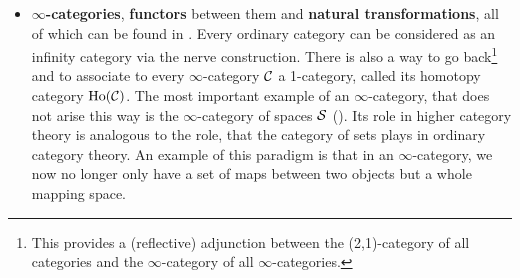 \begin{itemize}
    \item \textbf{$\infty$-categories}, \textbf{functors} between them and \textbf{natural transformations}, all of which can be found in \cite[Chapter~1]{HigherToposTheory}. Every ordinary category can be considered as an infinity category via the nerve construction. There is also a way to go back\footnote{This provides a (reflective) adjunction between the (2,1)-category of all categories and the $\infty$-category of all $\infty$-categories.} and to associate to every $\infty$-category $\mathcal{C}$ a 1-category, called its homotopy category $\operatorname{Ho}(\mathcal{C})$.
    The most important example of an $\infty$-category, that does not arise this way is the $\infty$-category of spaces $\mathcal{S}$ (\cite[Section~1.2.16]{HigherToposTheory}). Its role in higher category theory is analogous to the role, that the category of sets plays in ordinary category theory. An example of this paradigm is that in an $\infty$-category, we now no longer only have a set of maps between two objects but a whole mapping space. 
    

\end{itemize}
